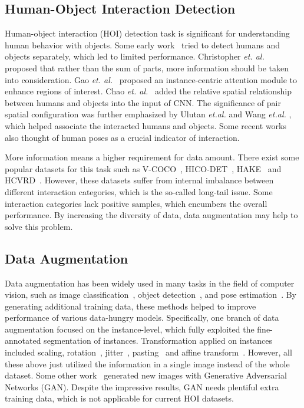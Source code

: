 \documentclass[10pt,twocolumn,letterpaper]{article}
\begin{document}
\subsection{Human-Object Interaction Detection}
Human-object interaction (HOI) detection task is significant for understanding human behavior with objects. Some early work~\cite{gupta2015visual} tried to detect humans and objects separately, which led to limited performance. Christopher \textit{et. al.}~\cite{baldassano2017human} proposed that rather than the sum of parts, more information should be taken into consideration. Gao \textit{et. al.}~\cite{gao2018ican} proposed an instance-centric attention module to enhance regions of interest. Chao \textit{et. al.}~\cite{chao2018learning} added the relative spatial relationship between humans and objects into the input of CNN. The significance of pair spatial configuration was further emphasized by Ulutan \textit{et.al.} and Wang \textit{et.al.} \cite{ulutan2020vsgnet, Wang_2020_CVPR}, which helped associate the interacted humans and objects. Some recent works~\cite{fang2018pairwise, wan2019pose,qi2018learning, li2019transferable, li2020pastanet} also thought of human poses as a crucial indicator of interaction.

More information means a higher requirement for data amount. There exist some popular datasets for this task such as V-COCO~\cite{gupta2015visual}, HICO-DET~\cite{chao2018learning}, HAKE~\cite{li2019hake} and HCVRD~\cite{zhuang2017care}. However, these datasets suffer from internal imbalance between different interaction categories, which is the so-called long-tail issue. Some interaction categories lack positive samples, which encumbers the overall performance. By increasing the diversity of data, data augmentation may help to solve this problem.

\subsection{Data Augmentation}
Data augmentation has been widely used in many tasks in the field of computer vision, such as image classification~\cite{cubuk2019randaugment,simard2003best,krizhevsky2012imagenet}, object detection~\cite{hinterstoisser2019annotation,liu2016ssd}, and pose estimation~\cite{peng2018jointly}. By generating additional training data, these methods helped to improve performance of various data-hungry models. Specifically, one branch of data augmentation focused on the instance-level, which fully exploited the fine-annotated segmentation of instances. Transformation applied on instances included scaling, rotation~\cite{jaderberg2015spatial}, jitter~\cite{fang2019instaboost}, pasting~\cite{kisantal2019augmentation} and affine transform~\cite{khoreva2019lucid}. However, all these above just utilized the information in a single image instead of the whole dataset. Some other work~\cite{choi2019self,qi2018semi,liu2017unsupervised} generated new images with Generative Adversarial Networks (GAN). Despite the impressive results, GAN needs plentiful extra training data, which is not applicable for current HOI datasets.
\end{document}
